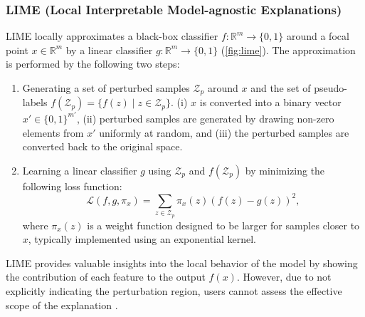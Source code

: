 \documentclass[11pt]{article}
\begin{document}
\subsubsection[LIME]{%
  LIME (Local Interpretable Model-agnostic Explanations)
  \cite{ribeiro2016why}
}
LIME locally
approximates a black-box classifier $f: \mathbb{R}^m \to \{0,1\}$
around a focal point $x \in \mathbb{R}^m$
by a linear classifier $g: \mathbb{R}^m \to \{0,1\}$
(\cref{fig:lime}).
The approximation is performed by the following two steps:
\begin{enumerate}
  \item Generating a set of perturbed samples $\mathcal{Z}_p$ around $x$
        and the set of pseudo-labels $f(\mathcal{Z}_p) = \{f(z) \mid z \in \mathcal{Z}_p\}$.
        (i) $x$ is converted into a binary vector
        $x'\in\{0,1\}^{m'}$,
        (ii) perturbed samples are generated by drawing non-zero elements
        from $x'$ uniformly at random,
        and (iii) the perturbed samples are converted back to the original space.
  \item Learning a linear classifier $g$
        using $\mathcal{Z}_p$ and $f(\mathcal{Z}_p)$
        by minimizing the following loss function:
        \begin{equation}
          \label{eq:lime_loss}
          \mathcal{L}(f,g,\pi_x)=\sum_{z\in\mathcal{Z}_p}
          \pi_x(z){\left(f(z)-g(z)\right)}^2,
        \end{equation}
        where $\pi_x(z)$ is a weight function designed to be larger for samples
        closer to $x$, typically implemented using an exponential kernel.
\end{enumerate}
LIME provides valuable insights into the local behavior of the model
by showing the contribution of each feature to the output $f(x)$.
However, due to not explicitly indicating the perturbation region,
users cannot assess the effective scope of the explanation
\cite{ribeiro2018anchors}.
\end{document}
